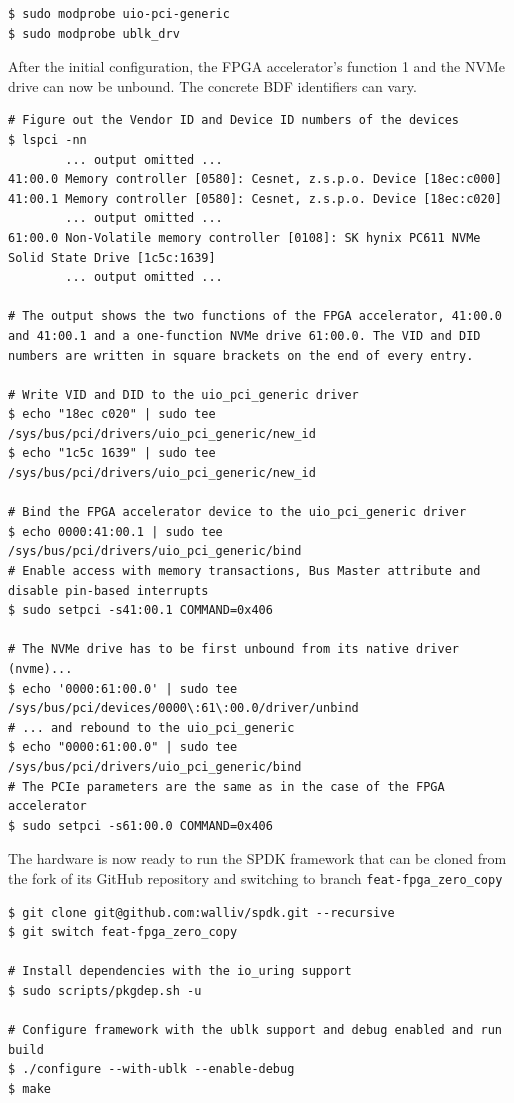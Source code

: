 \begin{lstlisting}[caption={Loading userspace drivers}]
$ sudo modprobe uio-pci-generic
$ sudo modprobe ublk_drv
\end{lstlisting}

After the initial configuration, the FPGA accelerator's function 1 and the NVMe drive can now be
unbound. The concrete \ac{BDF} identifiers can vary.

\begin{lstlisting}[caption={Unbinding PCIe devices}]
# Figure out the Vendor ID and Device ID numbers of the devices
$ lspci -nn
        ... output omitted ...
41:00.0 Memory controller [0580]: Cesnet, z.s.p.o. Device [18ec:c000]
41:00.1 Memory controller [0580]: Cesnet, z.s.p.o. Device [18ec:c020]
        ... output omitted ...
61:00.0 Non-Volatile memory controller [0108]: SK hynix PC611 NVMe Solid State Drive [1c5c:1639]
        ... output omitted ...

# The output shows the two functions of the FPGA accelerator, 41:00.0 and 41:00.1 and a one-function NVMe drive 61:00.0. The VID and DID numbers are written in square brackets on the end of every entry.

# Write VID and DID to the uio_pci_generic driver
$ echo "18ec c020" | sudo tee /sys/bus/pci/drivers/uio_pci_generic/new_id
$ echo "1c5c 1639" | sudo tee /sys/bus/pci/drivers/uio_pci_generic/new_id

# Bind the FPGA accelerator device to the uio_pci_generic driver
$ echo 0000:41:00.1 | sudo tee /sys/bus/pci/drivers/uio_pci_generic/bind
# Enable access with memory transactions, Bus Master attribute and disable pin-based interrupts
$ sudo setpci -s41:00.1 COMMAND=0x406

# The NVMe drive has to be first unbound from its native driver (nvme)...
$ echo '0000:61:00.0' | sudo tee /sys/bus/pci/devices/0000\:61\:00.0/driver/unbind
# ... and rebound to the uio_pci_generic
$ echo "0000:61:00.0" | sudo tee /sys/bus/pci/drivers/uio_pci_generic/bind
# The PCIe parameters are the same as in the case of the FPGA accelerator
$ sudo setpci -s61:00.0 COMMAND=0x406
\end{lstlisting}

The hardware is now ready to run the \ac{SPDK} framework that can be cloned from the fork of its
GitHub repository\cite{spdk_github} and switching to branch \verb|feat-fpga_zero_copy|

\begin{lstlisting}[caption={Building the SPDK application}]
$ git clone git@github.com:walliv/spdk.git --recursive
$ git switch feat-fpga_zero_copy

# Install dependencies with the io_uring support
$ sudo scripts/pkgdep.sh -u

# Configure framework with the ublk support and debug enabled and run build
$ ./configure --with-ublk --enable-debug
$ make
\end{lstlisting}

